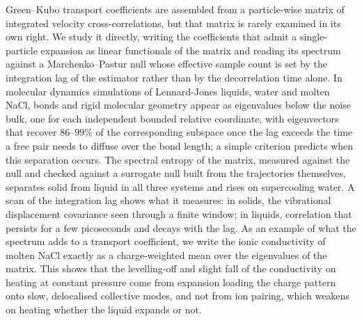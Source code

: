 Green--Kubo transport coefficients are assembled from a particle-wise matrix of integrated velocity cross-correlations, but that matrix is rarely examined in its own right.
We study it directly, writing the coefficients that admit a single-particle expansion as linear functionals of the matrix and reading its spectrum against a Marchenko--Pastur null whose effective sample count is set by the integration lag of the estimator rather than by the decorrelation time alone.
In molecular dynamics simulations of Lennard-Jones liquids, water and molten NaCl, bonds and rigid molecular geometry appear as eigenvalues below the noise bulk, one for each independent bounded relative coordinate, with eigenvectors that recover $86$--$99\%$ of the corresponding subspace once the lag exceeds the time a free pair needs to diffuse over the bond length; a simple criterion predicts when this separation occurs.
The spectral entropy of the matrix, measured against the null and checked against a surrogate null built from the trajectories themselves, separates solid from liquid in all three systems and rises on supercooling water.
A scan of the integration lag shows what it measures: in solids, the vibrational displacement covariance seen through a finite window; in liquids, correlation that persists for a few picoseconds and decays with the lag.
As an example of what the spectrum adds to a transport coefficient, we write the ionic conductivity of molten NaCl exactly as a charge-weighted mean over the eigenvalues of the matrix.
This shows that the levelling-off and slight fall of the conductivity on heating at constant pressure come from expansion loading the charge pattern onto slow, delocalised collective modes, and not from ion pairing, which weakens on heating whether the liquid expands or not.
